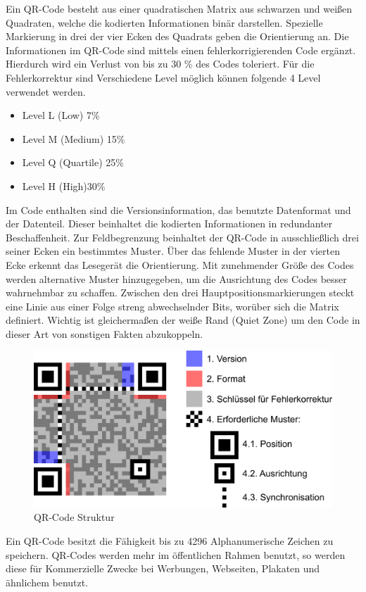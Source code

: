 \documentclass[12pt,					%
							 oneside,			%
							 a4paper,			%
							 halfparskip,		%
							 liststotoc,			%
							 bibtotoc,			%
							 fleqn,				%
							 pointlessnumbers]	%
							 {scrreprt}
\begin{document}
Ein QR-Code besteht aus einer quadratischen Matrix aus schwarzen und weißen Quadraten, welche die kodierten Informationen binär darstellen. Spezielle Markierung in drei der vier Ecken des Quadrats geben die Orientierung an. Die Informationen im QR-Code sind mittels einen fehlerkorrigierenden Code ergänzt. Hierdurch wird ein Verlust von bis zu 30 \% des Codes toleriert. Für die Fehlerkorrektur sind Verschiedene Level möglich können folgende 4 Level verwendet werden.
\begin{itemize}
\item Level L (Low) 7\%
\item Level M (Medium) 15\%
\item Level Q (Quartile) 25\% 
\item Level H (High)30\% 
\end{itemize}


Im Code enthalten sind die Versionsinformation, das benutzte Datenformat und der Datenteil. Dieser beinhaltet die kodierten Informationen in redundanter Beschaffenheit. Zur Feldbegrenzung beinhaltet der QR-Code in ausschließlich drei seiner Ecken ein bestimmtes Muster. Über das fehlende Muster in der vierten Ecke erkennt das Lesegerät die Orientierung. Mit zunehmender Größe des Codes werden alternative Muster hinzugegeben, um die Ausrichtung des Codes besser wahrnehmbar zu schaffen. Zwischen den drei Hauptpositionsmarkierungen steckt eine Linie aus einer Folge streng abwechselnder Bits, worüber sich die Matrix definiert. Wichtig ist gleichermaßen der weiße Rand (Quiet Zone) um den Code in dieser Art von sonstigen Fakten abzukoppeln. 
\begin{figure}[ht]
\centering   
	 \includegraphics[scale=0.12]{pictures/QRCodeBild} 
 	\caption{QR-Code Struktur}
\end{figure}

Ein QR-Code besitzt die Fähigkeit bis zu 4296 Alphanumerische Zeichen zu speichern. QR-Codes werden mehr im öffentlichen Rahmen benutzt, so werden diese für Kommerzielle Zwecke bei Werbungen, Webseiten, Plakaten und ähnlichem benutzt.
\end{document}

